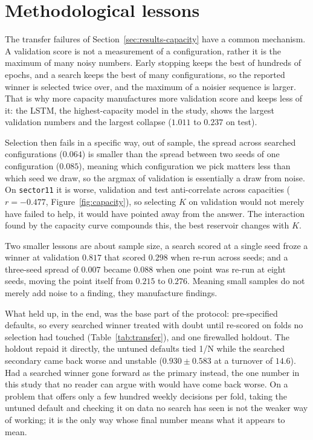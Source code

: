 \section{Methodological lessons}
\label{sec:disc-lessons}

The transfer failures of Section~\ref{sec:results-capacity} have a common
mechanism. A validation score is not a measurement of a configuration, rather it is the maximum of many noisy numbers. Early stopping keeps the best of hundreds of epochs, and a search keeps the best of many configurations, so the reported winner is selected twice over, and the maximum of a noisier sequence is larger. That is why more capacity manufactures more validation score and keeps less of it: the LSTM, the highest-capacity model in the study, shows the largest validation numbers and the largest collapse ($1.011$ to $0.237$ on test).

Selection then fails in a specific way, out of sample, the spread across searched configurations ($0.064$) is smaller than the spread between two seeds of one configuration ($0.085$), meaning which configuration we pick matters less than which seed we draw, so the argmax of validation is essentially a draw from noise. On \texttt{sector11} it is worse, validation and test anti-correlate across capacities ($r=-0.477$, Figure~\ref{fig:capacity}), so selecting $K$ on validation would not merely have failed to help, it would have pointed away from the answer. The interaction found by the capacity curve compounds this, the best reservoir changes with $K$.

Two smaller lessons are about sample size, a search scored at a single seed froze a winner at validation $0.817$ that scored $0.298$ when re-run across seeds; and a three-seed spread of $0.007$ became $0.088$ when one point was re-run at eight seeds, moving the point itself from $0.215$ to $0.276$. Meaning small samples do not merely add noise to a finding, they manufacture findings.

What held up, in the end, was the base part of the protocol: pre-specified defaults, so every searched winner treated with doubt until re-scored on folds no selection had touched (Table~\ref{tab:transfer}), and one firewalled holdout. The holdout repaid it directly, the untuned defaults tied 1/N while the searched secondary came back worse and unstable ($0.930 \pm 0.583$ at a turnover of $14.6$). Had a searched winner gone forward as the primary instead, the one number in this study that no reader can argue with would have come back worse. On a problem that offers only a few hundred weekly decisions per fold, taking the untuned default and checking it on data no search has seen is not the weaker way of working; it is the only way whose final number means what it appears to mean. 


